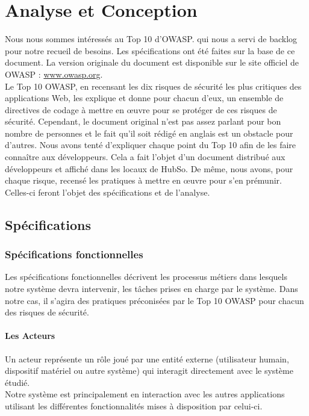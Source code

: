 \chapter{Analyse et Conception}
\minitoc
\clearpage
Nous nous sommes intéressés au Top 10 d'OWASP. qui nous a servi de backlog pour notre recueil de besoins. Les spécifications ont été faites sur la base de ce document. La version originale du document est disponible sur le site officiel de OWASP : \url{www.owasp.org}.\\
Le Top 10 OWASP, en recensant les dix risques de sécurité les plus critiques des applications Web, les explique et donne pour chacun d'eux, un ensemble de directives de codage à mettre en œuvre pour se protéger de ces risques de sécurité. Cependant, le document original n'est pas assez parlant pour bon nombre de personnes et le fait qu'il soit rédigé en anglais est un obstacle pour d'autres. Nous avons tenté d'expliquer chaque point du Top 10 afin de les faire connaître aux développeurs. Cela a fait l'objet d'un document distribué aux développeurs et affiché dans les locaux de HubSo. De même, nous avons, pour chaque risque, recensé les pratiques à mettre en œuvre pour s'en prémunir. Celles-ci feront l'objet des spécifications et de l'analyse.

\section{Spécifications}

\subsection{Spécifications fonctionnelles}
Les spécifications fonctionnelles décrivent les processus métiers dans lesquels notre système devra intervenir, les tâches prises en charge par le système. Dans notre cas, il s'agira des pratiques préconisées par le Top 10 OWASP pour chacun des risques de sécurité. 

\subsubsection{Les Acteurs}
Un acteur représente un rôle joué par une entité externe (utilisateur humain, dispositif matériel ou autre système) qui interagit directement avec le système étudié.\\
Notre système est principalement en interaction avec les autres applications utilisant les différentes fonctionnalités mises à disposition par celui-ci. 

